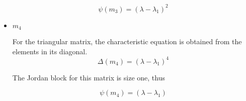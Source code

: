 \begin{itemize}
 \begin{equation*}
  \psi (m_3) = (\lambda - \lambda_1)^2
 \end{equation*}

 \item $m_4$

  For the triangular matrix, the characteristic equation
 is obtained from the elements in its diagonal.
 \begin{equation*}
  \Delta(m_4) = (\lambda - \lambda_1)^4
 \end{equation*}

 The Jordan block for this matrix is size one, thus

 \begin{equation*}
  \psi (m_4)  = (\lambda - \lambda_1)
 \end{equation*}

\end{itemize}
